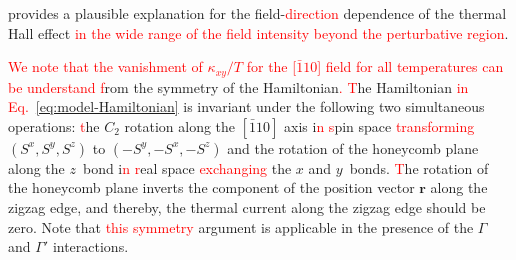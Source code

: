 \documentclass[twocolumn,superscriptaddress,showpacs, longbibliography, aps, prb]{revtex4-2}
\def\vec#1{\boldsymbol #1}
\newcommand{\red}[1]{\textcolor{red}{#1}}
\newcommand{\blue}[1]{\textcolor{blue}{#1}}
\newcommand{\orange}[1]{\textcolor{orange}{#1}}
\begin{document}
provides a plausible explanation for 
the field-\red{direction} %
dependence of the thermal Hall effect %
\red{in the wide range of the field intensity beyond the perturbative region}. 

\red{We note that the vanishment of $\kappa_{xy}/T$ for the [$\bar{1}10$] field for all temperatures can be understand 
f}rom the symmetry of the Hamiltonian\red{. %
T}he Hamiltonian \red{in Eq.~\eqref{eq:model-Hamiltonian}} is invariant under the following two simultaneous operations: %
\red{t}he $C_2$ rotation along the $[\bar{1}10]$ axis i\red{n %
s}pin space %
\red{transforming} $(S^x,S^y,S^z)$ to $(-S^y,-S^x,-S^z)$ and the rotation of the honeycomb plane along the $z$~bond i\red{n %
r}eal space %
\red{exchanging} the $x$ and $y$~bonds.
\red{T}he rotation of the honeycomb plane inverts the component of the position vector $\bm{r}$ along the zigzag edge, and thereby, the thermal current along the zigzag edge should be zero.
Note that %
\red{this symmetry} argument is applicable in the presence of the $\Gamma$ and $\Gamma'$ interactions.

\fi
\end{document}
